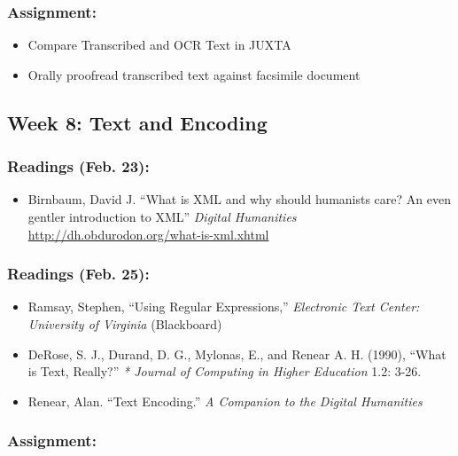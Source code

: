 \documentclass[]{article}
\begin{document}
\subsubsection{Assignment:}\label{assignment-5}

\begin{itemize}
\itemsep1pt\parskip0pt
\item
  Compare Transcribed and OCR Text in JUXTA\\
\item
  Orally proofread transcribed text against facsimile document
\end{itemize}

\subsection{Week 8: Text and Encoding}\label{week-8-text-and-encoding}

\subsubsection{Readings (Feb. 23):}\label{readings-feb.-23}

\begin{itemize}
\itemsep1pt\parskip0pt
\item
  Birnbaum, David J. ``What is XML and why should humanists care? An
  even gentler introduction to XML'' \emph{Digital Humanities}
  \url{http://dh.obdurodon.org/what-is-xml.xhtml}
\end{itemize}

\subsubsection{Readings (Feb. 25):}\label{readings-feb.-25}

\begin{itemize}
\itemsep1pt\parskip0pt
\item
  Ramsay, Stephen, ``Using Regular Expressions,'' \emph{Electronic Text
  Center: University of Virginia} (Blackboard)
\item
  DeRose, S. J., Durand, D. G., Mylonas, E., and Renear A. H. (1990),
  ``What is Text, Really?'' \emph{* Journal of Computing in Higher
  Education} 1.2: 3-26.
\item
  Renear, Alan. ``Text Encoding.'' \emph{A Companion to the Digital
  Humanities}
\end{itemize}

\subsubsection{Assignment:}\label{assignment-6}
\end{document}

